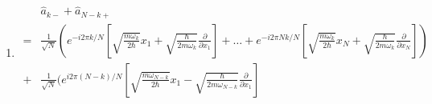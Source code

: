 \begin{enumerate}
\begin{align*}
           e^{i2\pi j(k'-k)/N}
            (
            -\sqrt{\frac{\omega_k}{4\omega_{k'}}}
           +\sqrt{\frac{\omega_{k'}}{4\omega_k}}
           )\\
           =&0.
       \end{align*}
       \begin{align*}
           [\hat a_{k+}, \hat a_{k'+}]
           =&\bigg[
           \frac{1}{\sqrt{N}}
           \sum_{j=1}^N e^{-i2\pi jk /N}
           \left(\sqrt{\frac{m\omega_k}{2\hbar}}x_j-
           \sqrt{\frac{\hbar}{2m\omega_k}}\frac{\partial}{\partial x_j}\right),\\
           &\frac{1}{\sqrt{N}}
           \sum_{s=1}^N e^{i2\pi sk' /N}
           \left(\sqrt{\frac{m\omega_{k'}}{2\hbar}}x_s-
           \sqrt{\frac{\hbar}{2m\omega_{k'}}}\frac{\partial}{\partial x_s}\right)
           \bigg]\\
           =&
           \frac{1}{N}
           \sum_{s,j=1}^N
           e^{-i2\pi jk /N}
           e^{i2\pi sk' /N}
           (
            -\sqrt{\frac{m\omega_k}{2\hbar}}\sqrt{\frac{\hbar}{2m\omega_{k'}}}
            [x_j, \frac{\partial}{\partial x_s}]
           -\sqrt{\frac{m\omega_{k'}}{2\hbar}}\sqrt{\frac{\hbar}{2m\omega_{k}}}
           [\frac{\partial}{\partial x_j}, x_s]
           )\\
           =&
           \frac{1}{N}
           \sum_{j=1}^N
           e^{i2\pi j(k'-k)/N}
            (
            \sqrt{\frac{\omega_k}{4\omega_{k'}}}
           -\sqrt{\frac{\omega_{k'}}{4\omega_k}}
           )\\
           =&0.
       \end{align*}
    \item 
    \begin{align*}
        &\hat a_{k-}+ \hat a_{N-k+}\\
        =& 
        \frac{1}{\sqrt{N}}
        \left(
        e^{-i2\pi k/N}
        \left[
        \sqrt{\frac{m\omega_k}{2\hbar}}x_1
        +
        \sqrt{\frac{\hbar}{2m\omega_k}}\frac{\partial}{\partial x_1}
        \right]
        +\dots 
        +
        e^{-i2\pi Nk/N}
        \left[
        \sqrt{\frac{m\omega_k}{2\hbar}}x_N
        +
        \sqrt{\frac{\hbar}{2m\omega_k}}\frac{\partial}{\partial x_N}
        \right]
        \right)\\
        +&
        \frac{1}{\sqrt{N}}
        \bigg(
        e^{i2\pi (N-k)/N}
        \left[
        \sqrt{\frac{m\omega_{N-k}}{2\hbar}}x_1
        -
        \sqrt{\frac{\hbar}{2m\omega_{N-k}}}\frac{\partial}{\partial x_1}
        \right]\\

\end{align*}
\end{enumerate}
